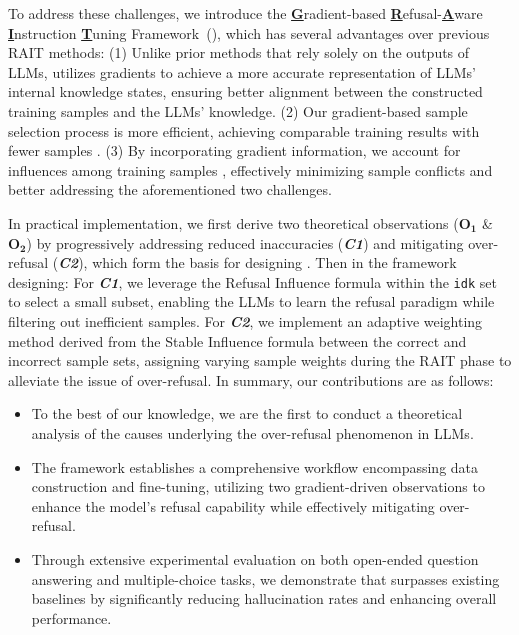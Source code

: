 To address these challenges, we introduce the \textbf{\underline{G}}radient-based \textbf{\underline{R}}efusal-\textbf{\underline{A}}ware \textbf{\underline{I}}nstruction \textbf{\underline{T}}uning Framework~(\textbf{\M}), which has several advantages over previous RAIT methods:
(1) Unlike prior methods that rely solely on the outputs of LLMs, \M utilizes gradients to achieve a more accurate representation of LLMs' internal knowledge states, ensuring better alignment between the constructed training samples and the LLMs' knowledge.
(2) Our gradient-based sample selection process is more efficient, achieving comparable training results with fewer samples \cite{Xia_Malladi_Gururangan_Arora_Chen, xu2024parenting}.
(3) By incorporating gradient information, we account for influences among training samples \cite{ren2024learningdynamics}, effectively minimizing sample conflicts \cite{zhu2024utilizeflowsteppingriver} and better addressing the aforementioned two challenges.

In practical implementation, we first derive two theoretical observations ($\mathbf{O_1}$ \& $\mathbf{O_2}$) by progressively addressing reduced inaccuracies (\textit{\textbf{C1}}) and mitigating over-refusal (\textit{\textbf{C2}}), which form the basis for designing \M. 
Then in the framework designing:  For \textbf{\textit{C1}}, we leverage the Refusal Influence formula within the \texttt{idk} set to select a small subset, enabling the LLMs to learn the refusal paradigm while filtering out inefficient samples.
 For \textbf{\textit{C2}}, we implement an adaptive weighting method derived from the Stable Influence formula between the correct and incorrect sample sets, assigning varying sample weights during the RAIT phase to alleviate the issue of over-refusal. In summary, our contributions are as follows:

\begin{itemize}[leftmargin=*,noitemsep,topsep=2pt]
\item To the best of our knowledge, we are the first to conduct a theoretical analysis of the causes underlying the over-refusal phenomenon in LLMs.
\item The \M framework establishes a comprehensive workflow encompassing data construction and fine-tuning, utilizing two gradient-driven observations to enhance the model's refusal capability while effectively mitigating over-refusal.
\item Through extensive experimental evaluation on both open-ended question answering and multiple-choice tasks, we demonstrate that \M surpasses existing baselines by significantly reducing hallucination rates and enhancing overall performance.
\end{itemize}

